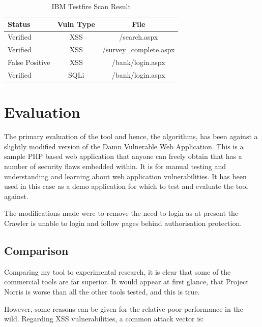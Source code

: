 \documentclass[12pt,a4paper]{article}
\begin{document}
\begin{center}
    \begin{table}
        \caption{IBM Testfire Scan Result}
        \begin{center}
            \begin{tabular}{ | l | c | c | }
                \hline
                Status & Vuln Type & File \\ \hline
                Verified & XSS & /search.aspx \\ \hline
                Verified & XSS & /survey\_complete.aspx \\ \hline
                False Positive & XSS & /bank/login.aspx \\ \hline
                Verified & SQLi & /bank/login.aspx \\ 
                \hline
            \end{tabular}
        \end{center}
    \end{table}
\end{center}

\section{Evaluation}
The primary evaluation of the tool and hence, the algorithms, has been against a slightly modified version of the Damn Vulnerable Web Application.  This is a sample PHP based web application that anyone can freely obtain that has a number of security flaws embedded within.  It is for manual testing and understanding and learning about web application vulnerabilities.  It has been used in this case as a demo application for which to test and evaluate the tool against.

The modifications made were to remove the need to login as at present the Crawler is unable to login and follow pages behind authorisation protection.

\subsection{Comparison}
Comparing my tool to experimental research, it is clear that some of the commercial tools are far superior. It would appear at first glance, that Project Norris is worse than all the other tools tested, and this is true.

However, some reasons can be given for the relative poor performance in the wild. Regarding XSS vulnerabilities, a common attack vector is:
\end{document}
